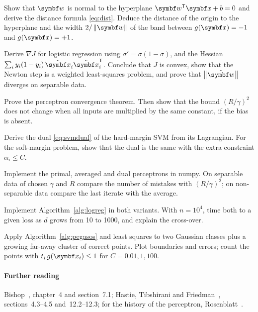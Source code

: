 \documentclass[11pt]{article}
\newcommand{\w}{\vect{w}}
\newcommand{\xt}{\tilde{\x}}
\newcommand{\wt}{\tilde{\w}}
\begin{document}
\begin{questions}
\begin{derivations}
\item Show that $\w$ is normal to the hyperplane $\w\T\x + b = 0$ and derive the distance formula \eqref{eq:dist}.
Deduce the distance of the origin to the hyperplane and the width $2/\norm{\w}$ of the band between $g(\x) = -1$ and
$g(\x) = +1$.
\item Derive $\nabla J$ for logistic regression using $\sigma' = \sigma(1 - \sigma)$, and the Hessian
$\sum_i y_i(1 - y_i)\,\xt_i\xt_i\T$. Conclude that $J$ is convex, show that the Newton step is a weighted least-squares
problem, and prove that $\norm{\wt}$ diverges on separable data.
\item Prove the perceptron convergence theorem. Then show that the bound $(R/\gamma)^2$ does not change when all inputs
are multiplied by the same constant, if the bias is absent.
\item Derive the dual \eqref{eq:svmdual} of the hard-margin SVM from its Lagrangian. For the soft-margin problem, show
that the dual is the same with the extra constraint $\alpha_i \le C$.
\end{derivations}

\begin{programming}
\item Implement the primal, averaged and dual perceptrons in numpy. On separable data of chosen $\gamma$ and $R$ compare
the number of mistakes with $(R/\gamma)^2$; on non-separable data compare the last iterate with the average.
\item Implement Algorithm~\ref{alg:logreg} in both variants. With $n = 10^4$, time both to a given loss as $d$ grows from
10 to 1000, and explain the cross-over.
\item Apply Algorithm~\ref{alg:pegasos} and least squares to two Gaussian classes plus a growing far-away cluster of
correct points. Plot boundaries and errors; count the points with $t_i\,g(\x_i) \le 1$ for $C = 0.01, 1, 100$.
\end{programming}
\end{questions}

\paragraph{Further reading} Bishop~\cite{bishop2006}, chapter~4 and section~7.1; Hastie, Tibshirani and
Friedman~\cite{hastie2009}, sections~4.3--4.5 and~12.2--12.3; for the history of the perceptron,
Rosenblatt~\cite{rosenblatt1958}.
\end{document}
